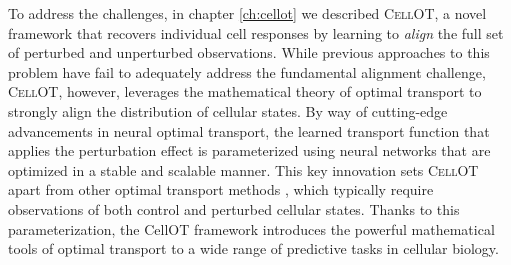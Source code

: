 To address the challenges, in chapter \ref{ch:cellot} we described \textsc{CellOT}, a novel framework that recovers individual cell responses by learning to \emph{align} the full set of perturbed and unperturbed observations. 
While previous approaches to this problem have fail to adequately address the fundamental alignment challenge,
\textsc{CellOT}, however, leverages the mathematical theory of optimal transport to strongly align the distribution of cellular states.
By way of cutting-edge advancements in neural optimal transport, the learned transport function that applies the perturbation effect is parameterized using neural networks that are optimized in a stable and scalable manner.
This key innovation sets \textsc{CellOT} apart from other optimal transport methods \cite{schiebinger2019}, which typically require observations of both control and perturbed cellular states.
Thanks to this parameterization, the CellOT framework introduces the powerful mathematical tools of optimal transport to a wide range of predictive tasks in cellular biology.


